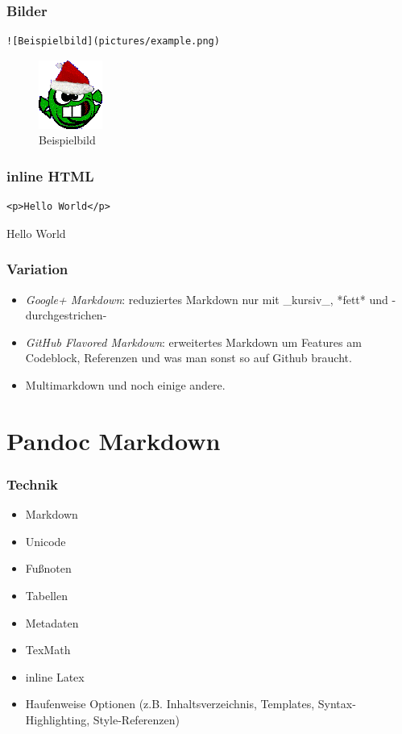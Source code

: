 \begin{frame}[fragile]\frametitle{Bilder}

\begin{verbatim}
![Beispielbild](pictures/example.png)
\end{verbatim}

\begin{figure}[htbp]
\centering
\includegraphics{pictures/example.png}
\caption{Beispielbild}
\end{figure}

\end{frame}

\begin{frame}[fragile]\frametitle{inline HTML}

\begin{verbatim}
<p>Hello World</p>
\end{verbatim}

Hello World

\end{frame}

\begin{frame}\frametitle{Variation}

\begin{itemize}
\item
  \emph{Google+ Markdown}: reduziertes Markdown nur mit \_kursiv\_,
  *fett* und -durchgestrichen-
\item
  \emph{GitHub Flavored Markdown}: erweitertes Markdown um Features am
  Codeblock, Referenzen und was man sonst so auf Github braucht.
\item
  Multimarkdown und noch einige andere.
\end{itemize}

\end{frame}

\section{Pandoc Markdown}

\begin{frame}\frametitle{Technik}

\begin{itemize}
\item
  Markdown
\item
  Unicode
\item
  Fußnoten
\item
  Tabellen
\item
  Metadaten
\item
  TexMath
\item
  inline Latex
\item
  Haufenweise Optionen (z.B. Inhaltsverzeichnis, Templates,
  Syntax-Highlighting, Style-Referenzen)
\end{itemize}

\end{frame}

